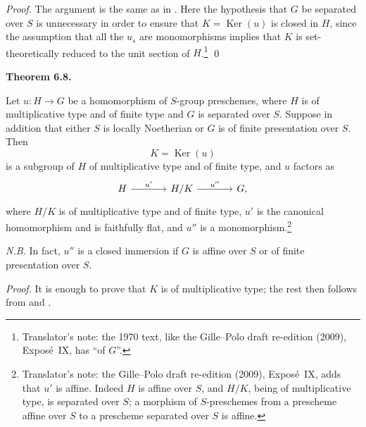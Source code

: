 \emph{Proof.}
The argument is the same as in
. Here the hypothesis that \(G\)
be separated over \(S\) is unnecessary in order to ensure that
\(K=\operatorname{Ker}(u)\) is closed in \(H\), since the assumption
that all the \(u_s\) are monomorphisms implies that \(K\) is
set-theoretically reduced to the unit section of \(H\).\footnote{Translator's
note: the 1970 text, like the Gille--Polo draft re-edition (2009),
Expos\'e~IX, has ``of \(G\)''.} \qed

\medskip
\noindent{}\textbf{Theorem 6.8.}
\begin{itshape}
Let \(u:H\to G\) be a homomorphism of \(S\)-group preschemes,
where \(H\) is of multiplicative type and of finite type and \(G\) is
separated over \(S\). Suppose in addition that either \(S\) is locally
Noetherian or \(G\) is of finite presentation over \(S\). Then
\[
  K=\operatorname{Ker}(u)
\]
is a subgroup of \(H\) of multiplicative type and of finite type, and
\(u\) factors as
\[
\begin{tikzcd}[column sep=large]
  H
    \arrow[r,"u'"]
  & H/K
    \arrow[r,"u''"]
  & G,
\end{tikzcd}
\]
where \(H/K\) is of multiplicative type and of finite type,
\(u'\) is the canonical homomorphism and is faithfully flat, and
\(u''\) is a monomorphism.\footnote{Translator's note: the Gille--Polo
draft re-edition (2009), Expos\'e~IX, adds that \(u'\) is affine. Indeed
\(H\) is affine over \(S\), and \(H/K\), being of multiplicative type, is
separated over \(S\); a morphism of \(S\)-preschemes from a prescheme affine
over \(S\) to a prescheme separated over \(S\) is affine.}
\end{itshape}

\emph{N.B.}
In fact, \(u''\) is a closed immersion if \(G\) is affine over \(S\) or
of finite presentation over \(S\).

\emph{Proof.}
It is enough to prove that \(K\) is of multiplicative type; the rest
then follows from  and .

